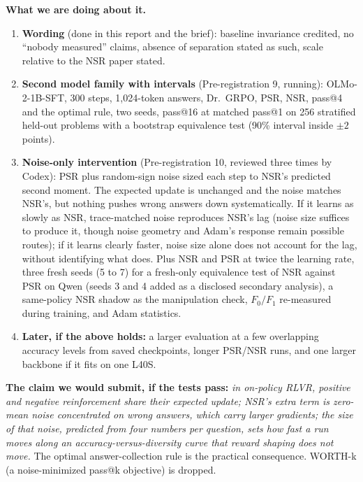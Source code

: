 \documentclass[11pt]{article}
\begin{document}
\textbf{What we are doing about it.}
\begin{enumerate}[leftmargin=*,itemsep=2pt]
\item \textbf{Wording} (done in this report and the brief): baseline invariance credited, no ``nobody measured'' claims, absence of separation stated as such, scale relative to the NSR paper stated.
\item \textbf{Second model family with intervals} (Pre-registration 9, running): OLMo-2-1B-SFT, 300 steps, 1{,}024-token answers, Dr.\ GRPO, PSR, NSR, pass@4 and the optimal rule, two seeds, pass@16 at matched pass@1 on 256 stratified held-out problems with a bootstrap equivalence test (90\% interval inside $\pm2$ points).
\item \textbf{Noise-only intervention} (Pre-registration 10, reviewed three times by Codex): PSR plus random-sign noise sized each step to NSR's predicted second moment. The expected update is unchanged and the noise matches NSR's, but nothing pushes wrong answers down systematically. If it learns as slowly as NSR, trace-matched noise reproduces NSR's lag (noise size suffices to produce it, though noise geometry and Adam's response remain possible routes); if it learns clearly faster, noise size alone does not account for the lag, without identifying what does. Plus NSR and PSR at twice the learning rate, three fresh seeds (5 to 7) for a fresh-only equivalence test of NSR against PSR on Qwen (seeds 3 and 4 added as a disclosed secondary analysis), a same-policy NSR shadow as the manipulation check, $F_0/F_1$ re-measured during training, and Adam statistics.
\item \textbf{Later, if the above holds:} a larger evaluation at a few overlapping accuracy levels from saved checkpoints, longer PSR/NSR runs, and one larger backbone if it fits on one L40S.
\end{enumerate}

\textbf{The claim we would submit, if the tests pass:} \emph{in on-policy RLVR, positive and negative reinforcement share their expected update; NSR's extra term is zero-mean noise concentrated on wrong answers, which carry larger gradients; the size of that noise, predicted from four numbers per question, sets how fast a run moves along an accuracy-versus-diversity curve that reward shaping does not move.} The optimal answer-collection rule is the practical consequence. WORTH-k (a noise-minimized pass@k objective) is dropped.

\appendix
\end{document}
